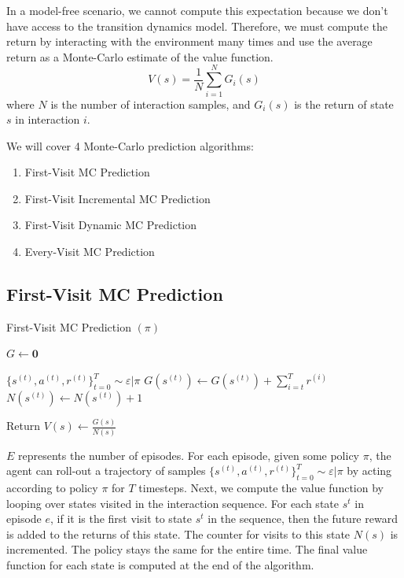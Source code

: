 \documentclass[11pt]{article}
\begin{document}
In a model-free scenario, we cannot compute this expectation because we don't have access to the transition dynamics model. Therefore, we must compute the return by interacting with the environment many times and use the average return as a Monte-Carlo estimate of the value function.
\begin{equation}
    V(s) = \frac{1}{N} \sum_{i=1}^N G_i(s)
\end{equation}
where $N$ is the number of interaction samples, and $G_i(s)$ is the return of state $s$ in interaction $i$.  

We will cover 4 Monte-Carlo prediction algorithms:
\begin{enumerate}
    \item First-Visit MC Prediction
    \item First-Visit Incremental MC Prediction
    \item First-Visit Dynamic MC Prediction
    \item Every-Visit MC Prediction
\end{enumerate}


\subsection{First-Visit MC Prediction}
\begin{algorithm}[H]
\caption{First-Visit MC Prediction $(\pi)$}
\label{algo:FVMC}
\begin{algorithmic}[1]
\STATE $G \leftarrow \mathbf{0}$ \hfill
{}

\STATE $\{s^{(t)}, a^{(t)}, r^{(t)}\}_{t=0}^T \sim \varepsilon|\pi$ \hfill 
{}
\STATE $G(s^{(t)}) \leftarrow G(s^{(t)}) + \sum_{i=t}^T r^{(i)}$ \hfill 
\STATE $N(s^{(t)}) \leftarrow N(s^{(t)})  + 1$ \hfill 
\ENDIF


\ENDFOR

\ENDFOR

\STATE Return $V(s) \leftarrow \frac{G(s)}{N(s)}$  \hfill
\end{algorithmic}
\end{algorithm}

$E$ represents the number of episodes. For each episode, given some policy $\pi$, the agent can roll-out a trajectory of samples $\{s^{(t)}, a^{(t)}, r^{(t)}\}_{t=0}^T \sim \varepsilon|\pi$ by acting according to policy $\pi$ for $T$ timesteps. Next, we compute the value function by looping over states visited in the interaction sequence. For each state $s^t$ in episode $e$, if it is the first visit to state $s^t$ in the sequence, then the future reward is added to the returns of this state. The counter for visits to this state $N(s)$ is incremented. The policy stays the same for the entire time. The final value function for each state is computed at the end of the algorithm.
\end{document}
